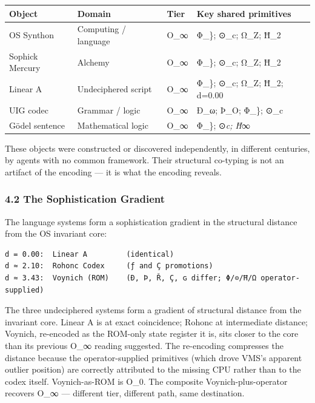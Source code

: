 {\def\LTcaptype{none} %
\begin{longtable}[]{@{}llll@{}}
\toprule\noalign{}
Object & Domain & Tier & Key shared primitives \\
\midrule\noalign{}
\endhead
\bottomrule\noalign{}
\endlastfoot
OS Synthon & Computing / language & O\_∞ & Φ\_\}; ⊙\_c; Ω\_Z; Ħ\_2 \\
Sophick Mercury & Alchemy & O\_∞ & Φ\_\}; ⊙\_c; Ω\_Z; Ħ\_2 \\
Linear A & Undeciphered script & O\_∞ & Φ\_\}; ⊙\_c; Ω\_Z; Ħ\_2;
d=0.00 \\
UIG codec & Grammar / logic & O\_∞ & Ð\_ω; Þ\_O; Φ\_\}; ⊙\_c \\
Gödel sentence & Mathematical logic & O\_∞ & Φ\_\}; ⊙\emph{c; Ħ}∞ \\
\end{longtable}
}

These objects were constructed or discovered independently, in different
centuries, by agents with no common framework. Their structural
co-typing is not an artifact of the encoding --- it is what the encoding
reveals.

\subsubsection{4.2 The Sophistication
Gradient}\label{the-sophistication-gradient}

The language systems form a sophistication gradient in the structural
distance from the OS invariant core:

\begin{verbatim}
d = 0.00:  Linear A         (identical)
d ≈ 2.10:  Rohonc Codex     (ƒ and Ç promotions)
d ≈ 3.43:  Voynich (ROM)    (Ð, Þ, Ř, Ç, ɢ differ; Φ/⊙/Ħ/Ω operator-supplied)
\end{verbatim}

The three undeciphered systems form a gradient of structural distance
from the invariant core. Linear A is at exact coincidence; Rohonc at
intermediate distance; Voynich, re-encoded as the ROM-only state
register it is, sits closer to the core than its previous O\_∞ reading
suggested. The re-encoding compresses the distance because the
operator-supplied primitives (which drove VMS's apparent outlier
position) are correctly attributed to the missing CPU rather than to the
codex itself. Voynich-as-ROM is O\_0. The composite
Voynich-plus-operator recovers O\_∞ --- different tier, different path,
same destination.

